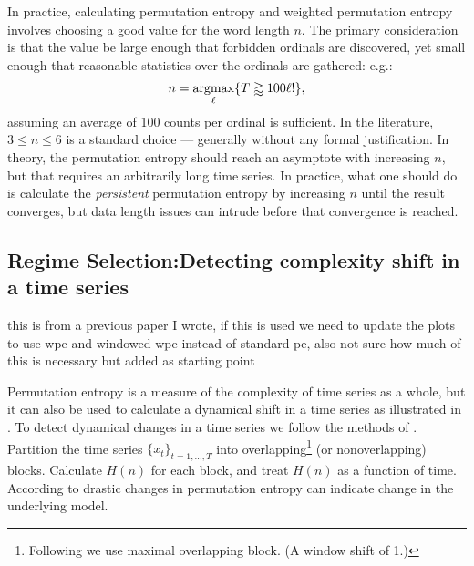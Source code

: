 In practice, calculating permutation entropy and weighted permutation entropy
involves choosing a good value for the word length $n$. The primary
consideration is that the value be large enough that forbidden ordinals are
discovered, yet small enough that reasonable statistics over the ordinals are
gathered: e.g.:
\begin{align*}
  n = \operatornamewithlimits{argmax}_\ell \{ T \gtrapprox 100 \ell! \},
\end{align*}
assuming an average of 100 counts per ordinal is sufficient. In the literature,
$3 \le n \le 6$ is a standard choice --- generally without any formal
justification. In theory, the permutation entropy should reach an asymptote with
increasing $n$, but that requires an arbitrarily long time series. In practice,
what one should do is calculate the \emph{persistent} permutation entropy by
increasing $n$ until the result converges, but data length issues can intrude
before that convergence is reached.

\subsection{Regime Selection:Detecting complexity shift in a time series}\label{sec:wpeRegime}

{\color{red} this is from a previous paper I wrote, if this is used we need to update the plots to use wpe and windowed wpe instead of standard pe, also not sure how much of this is necessary but added as starting point}

Permutation entropy is a measure of the complexity of time series as a whole, but it can also be used to calculate a dynamical shift in a time series as illustrated in \cite{cao2004det}. To detect dynamical changes in a time series we follow the methods of \cite{cao2004det}. Partition the time series  $\{x_t\}_{t = 1,\dots,T}$ into overlapping\footnote{Following \cite{cao2004det} we use maximal overlapping block. (A window shift of 1.)} (or nonoverlapping) blocks. Calculate $H(n)$ for each block, and treat $H(n)$ as a function of time.  According to \cite{cao2004det} drastic changes in permutation entropy can indicate change in the underlying model.

